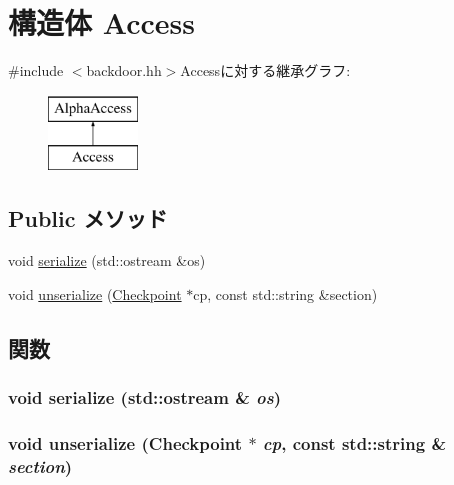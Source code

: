 \hypertarget{structAlphaBackdoor_1_1Access}{
\section{構造体 Access}
\label{structAlphaBackdoor_1_1Access}
}


{\ttfamily \#include $<$backdoor.hh$>$}Accessに対する継承グラフ:\begin{figure}[H]
\begin{center}
\leavevmode
\includegraphics[height=2cm]{structAlphaBackdoor_1_1Access}
\end{center}
\end{figure}
\subsection*{Public メソッド}
\begin{DoxyCompactItemize}
\item 
void \hyperlink{structAlphaBackdoor_1_1Access_a53e036786d17361be4c7320d39c99b84}{serialize} (std::ostream \&os)
\item 
void \hyperlink{structAlphaBackdoor_1_1Access_af22e5d6d660b97db37003ac61ac4ee49}{unserialize} (\hyperlink{classCheckpoint}{Checkpoint} $\ast$cp, const std::string \&section)
\end{DoxyCompactItemize}


\subsection{関数}
\hypertarget{structAlphaBackdoor_1_1Access_a53e036786d17361be4c7320d39c99b84}{
\subsubsection[{serialize}]{\setlength{\rightskip}{0pt plus 5cm}void serialize (std::ostream \& {\em os})}}
\label{structAlphaBackdoor_1_1Access_a53e036786d17361be4c7320d39c99b84}
\hypertarget{structAlphaBackdoor_1_1Access_af22e5d6d660b97db37003ac61ac4ee49}{
\subsubsection[{unserialize}]{\setlength{\rightskip}{0pt plus 5cm}void unserialize ({\bf Checkpoint} $\ast$ {\em cp}, \/  const std::string \& {\em section})}}
\label{structAlphaBackdoor_1_1Access_af22e5d6d660b97db37003ac61ac4ee49}



